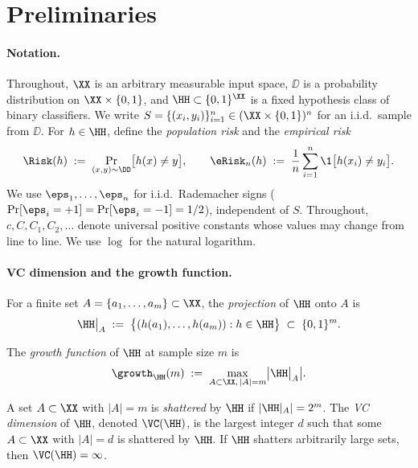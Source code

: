 \section{Preliminaries}\label{sec:preliminaries}

\paragraph{Notation.}
Throughout, $\XX$ is an arbitrary measurable input space, $\DD$ is a probability distribution on $\XX \times \{0,1\}$, and $\HH \subset \{0,1\}^{\XX}$ is a fixed hypothesis class of binary classifiers. We write $S = \{(x_i, y_i)\}_{i=1}^n \in (\XX \times \{0,1\})^n$ for an i.i.d.\ sample from $\DD$. For $h \in \HH$, define the \emph{population risk} and the \emph{empirical risk}
\begin{align*}
\Risk(h) \;:=\; \Pr_{(x,y) \sim \DD}\bigl[ h(x) \ne y \bigr],
\qquad
\eRisk_n(h) \;:=\; \frac{1}{n} \sum_{i=1}^{n} \1\bigl[ h(x_i) \ne y_i \bigr].
\end{align*}
We use $\eps_1, \ldots, \eps_n$ for i.i.d.\ Rademacher signs ($\Pr[\eps_i = +1] = \Pr[\eps_i = -1] = 1/2$), independent of $S$. Throughout, $c, C, C_1, C_2, \ldots$ denote universal positive constants whose values may change from line to line. We use $\log$ for the natural logarithm.

\paragraph{VC dimension and the growth function.}
For a finite set $A = \{a_1, \ldots, a_m\} \subset \XX$, the \emph{projection} of $\HH$ onto $A$ is
\begin{align*}
\HH\big|_{A} \;:=\; \bigl\{ (h(a_1), \ldots, h(a_m)) : h \in \HH \bigr\} \;\subset\; \{0,1\}^{m}.
\end{align*}

\begin{definition}\label{def:growth}
The \emph{growth function} of $\HH$ at sample size $m$ is
\begin{align*}
\growth_{\HH}(m) \;:=\; \max_{A \subset \XX,\, |A| = m} \bigl| \HH\big|_{A} \bigr|.
\end{align*}
\end{definition}

\begin{definition}[VC dimension]\label{def:vc}
A set $A \subset \XX$ with $|A| = m$ is \emph{shattered} by $\HH$ if $|\HH|_A| = 2^m$. The \emph{VC dimension} of $\HH$, denoted $\VC(\HH)$, is the largest integer $d$ such that some $A \subset \XX$ with $|A| = d$ is shattered by $\HH$. If $\HH$ shatters arbitrarily large sets, then $\VC(\HH) = \infty$.
\end{definition}

